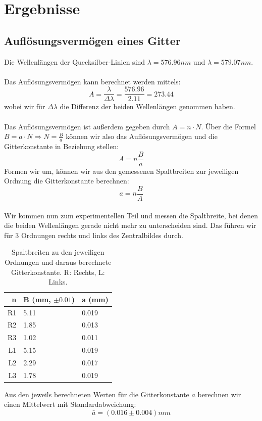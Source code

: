 \documentclass{article}
\begin{document}
\section{Ergebnisse}
\subsection*{Auflösungsvermögen eines Gitter}
%
%
Die Wellenlängen der Quecksilber-Linien sind $\lambda=576.96nm$ und $\lambda=579.07nm$.\\
\\
Das Auflösungsvermögen kann berechnet werden mittels:
$$\boxed{A=\frac{\lambda}{\Delta\lambda}=\frac{576.96}{2.11}=273.44}$$
wobei wir für $\Delta\lambda$ die Differenz der beiden Wellenlängen genommen haben.\\
\\
Das Auflösungsvermögen ist außerdem gegeben durch $A=n\cdot N$. Über die Formel $B=a\cdot N \Rightarrow N=\frac{B}{a}$ können wir also das Auflösungsvermögen und die Gitterkonstante in Beziehung stellen:
$$A=n\frac{B}{a}$$
Formen wir um, können wir aus den gemessenen Spaltbreiten zur jeweiligen Ordnung die Gitterkonstante berechnen:
$$\boxed{a=n\frac{B}{A}}$$
\\
Wir kommen nun zum experimentellen Teil und messen die Spaltbreite, bei denen die beiden Wellenlängen gerade nicht mehr zu unterscheiden sind. Das führen wir für 3 Ordnungen rechts und links des Zentralbildes durch.
\begin{table}[H]
\begin{center}
\begin{tabular}{|r|l|l|}
\hline
n & B (mm, $\pm 0.01$) & a (mm)\\
\hline
R1 & 5.11 & 0.019\\
R2 & 1.85 & 0.013\\
R3 & 1.02 & 0.011\\
L1 & 5.15 & 0.019\\
L2 & 2.29 & 0.017\\
L3 & 1.78 & 0.019\\
\hline
\end{tabular}
\caption{Spaltbreiten zu den jeweiligen Ordnungen und daraus berechnete Gitterkonstante. R: Rechts, L: Links.}
\end{center}
\end{table}
\vspace{0.3mm}
Aus den jeweils berechneten Werten für die Gitterkonstante $a$ berechnen wir einen Mittelwert mit Standardabweichung:
$$\boxed{\bar{a}=(0.016 \pm 0.004)mm}$$
\end{document}
